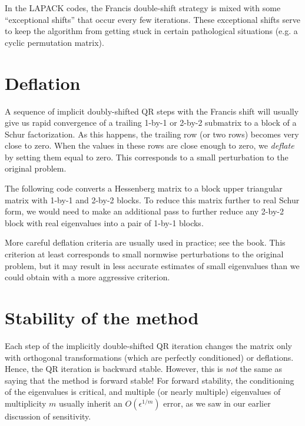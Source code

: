 \documentclass[12pt, leqno]{article} %
\begin{document}


In the LAPACK codes, the Francis double-shift strategy is mixed with
some ``exceptional shifts'' that occur every few iterations.
These exceptional shifts serve to keep the algorithm from getting
stuck in certain pathological situations (e.g. a cyclic permutation
matrix).

\section{Deflation}

A sequence of implicit doubly-shifted QR steps with the Francis shift
will usually give us rapid convergence of a trailing 1-by-1 or 2-by-2
submatrix to a block of a Schur factorization.  As this happens,
the trailing row (or two rows) becomes very close to zero.  When the
values in these rows are close enough to zero, we {\em deflate} by
setting them equal to zero.  This corresponds to a small perturbation
to the original problem.

The following code converts a Hessenberg matrix to a block upper triangular
matrix with 1-by-1 and 2-by-2 blocks.  To reduce this matrix further to
real Schur form, we would need to make an additional pass to further
reduce any 2-by-2 block with real eigenvalues into a pair of 1-by-1 blocks.



More careful deflation criteria are usually used in practice;
see the book.  This criterion at least corresponds to small normwise
perturbations to the original problem, but it may result in less
accurate estimates of small eigenvalues than we could obtain with
a more aggressive criterion.

\section{Stability of the method}

Each step of the implicitly double-shifted QR iteration changes the
matrix only with orthogonal transformations (which are perfectly conditioned)
or deflations.  Hence, the QR iteration is backward stable.  However,
this is {\em not} the same as saying that the method is forward stable!
For forward stability, the conditioning of the eigenvalues is critical,
and multiple (or nearly multiple) eigenvalues of multiplicity $m$
usually inherit an $O(\epsilon^{1/m})$ error, as we saw in our earlier
discussion of sensitivity.
\end{document}
